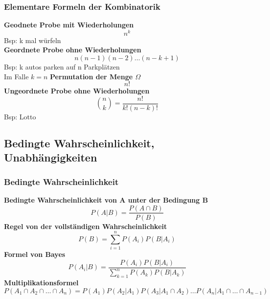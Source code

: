 \documentclass[
	ngerman,
	accentcolor=9c,%
	type=intern,
	marginpar=false
	]{tudapub}
\begin{document}
            \subsubsection{Elementare Formeln der Kombinatorik}
                \textbf{Geodnete Probe mit Wiederholungen}\\
                \begin{equation*}
                    n^k
                \end{equation*}
                Bsp: k mal würfeln\\
                \textbf{Geordnete Probe ohne Wiederholungen}
                \begin{equation*}
                    n(n-1)(n-2)\dots(n-k+1)
                \end{equation*}
                Bsp: k autos parken auf n Parkplätzen\\
                Im Falle $k=n$ \textbf{Permutation der Menge $\Omega$}
                \begin{equation*}
                    n!
                \end{equation*}
                \textbf{Ungeordnete Probe ohne Wiederholungen}
                \begin{equation}
                    \binom{n}{k} = \dfrac{n!}{k!(n-k)!}
                \end{equation}
                Bsp: Lotto
        \subsection{Bedingte Wahrscheinlichkeit, Unabhängigkeiten}
            \subsubsection{Bedingte Wahrscheinlichkeit}
                \textbf{Bedingte Wahrscheinlichkeit von A unter der Bedingung B}
                \begin{equation*}
                    P(A|B) = \dfrac{P(A\cap B)}{P(B)}
                \end{equation*}
                \textbf{Regel von der vollständigen Wahrscheinlichkeit}
                \begin{equation*}
                    P(B) = \sum_{i=1}^n P(A_i)P(B|A_i)
                \end{equation*}
                \textbf{Formel von Bayes}
                \begin{equation*}
                    P(A_i|B) = \dfrac{P(A_i)P(B|A_i)}{\sum_{k=1}^n P(A_k)P(B|A_k)}
                \end{equation*}
                \textbf{Multiplikationsformel}
                \begin{equation*}
                    P(A_1 \cap A_2 \cap \dots \cap A_n) = P(A_1)P(A_2|A_1)P(A_3|A_1 \cap A_2) \dots P(A_n|A_1 \cap \dots \cap A_{n-1})
                \end{equation*}
\end{document}
